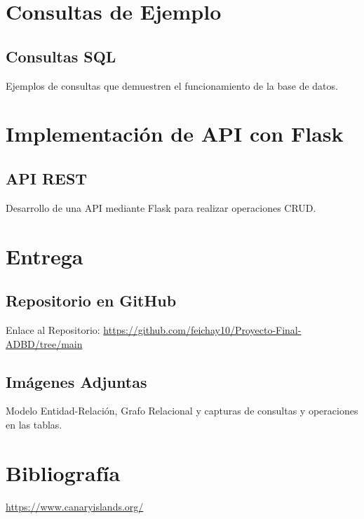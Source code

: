 \documentclass[11pt]{report}
\begin{document}
\section{Consultas de Ejemplo}

\subsection{Consultas SQL}
Ejemplos de consultas que demuestren el funcionamiento de la base de datos.

\section{Implementación de API con Flask}

\subsection{API REST}
Desarrollo de una API mediante Flask para realizar operaciones CRUD.

\section{Entrega}

\subsection{Repositorio en GitHub}
Enlace al Repositorio: \url{https://github.com/feichay10/Proyecto-Final-ADBD/tree/main}

\subsection{Imágenes Adjuntas}
Modelo Entidad-Relación, Grafo Relacional y capturas de consultas y operaciones en las tablas.

\section{Bibliografía}
\begin{thebibliography}{99}
     \url{https://www.canaryislands.org/}

\end{thebibliography}
\end{document}
